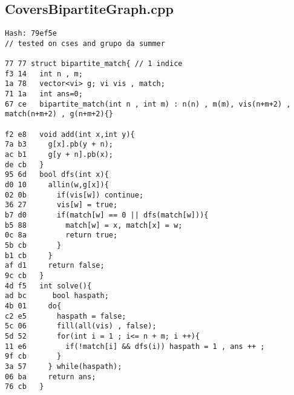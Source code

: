 \documentclass[11pt, a4paper, twoside]{article}
\begin{document}
\subsection{CoversBipartiteGraph.cpp}
\begin{lstlisting}
Hash: 79ef5e
// tested on cses and grupo da summer

77 77 struct bipartite_match{ // 1 indice
f3 14   int n , m;
1a 78   vector<vi> g; vi vis , match;
71 1a   int ans=0;
67 ce   bipartite_match(int n , int m) : n(n) , m(m), vis(n+m+2) , match(n+m+2) , g(n+m+2){}
       
f2 e8   void add(int x,int y){
7a b3     g[x].pb(y + n);
ac b1     g[y + n].pb(x);
de cb   }
95 6d   bool dfs(int x){
d0 10     allin(w,g[x]){
02 0b       if(vis[w]) continue;
36 27       vis[w] = true;
b7 d0       if(match[w] == 0 || dfs(match[w])){
b5 88         match[w] = x, match[x] = w; 
0c 8a         return true;
5b cb       }
b1 cb     }
af d1     return false;
9c cb   }
4d f5   int solve(){
ad bc      bool haspath;
4b 01     do{
c2 e5       haspath = false;
5c 06       fill(all(vis) , false);
5d 52       for(int i = 1 ; i<= n + m; i ++){
11 e6         if(!match[i] && dfs(i)) haspath = 1 , ans ++ ;
9f cb       }
3a 57     } while(haspath);
06 ba     return ans;
76 cb   }
      

\end{lstlisting}
\end{document}
